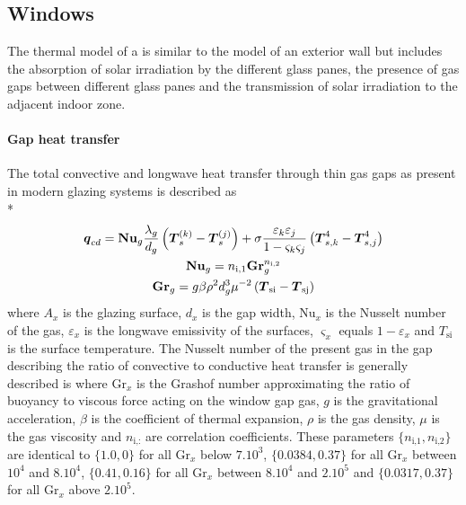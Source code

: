 \subsection{Windows}

The thermal model of a  is similar to the model of an exterior wall but includes the absorption of solar irradiation by the different glass panes, the presence of gas gaps between different glass panes and the transmission of solar irradiation to the adjacent indoor zone.

\paragraph{Gap heat transfer}
The total convective and longwave heat transfer through thin gas gaps as present in modern glazing systems is described as \\*
\begin{gather}
\boldsymbol{q}_{cd} = \mathbf{Nu}_{g} \frac{\lambda_{g}}{d_{g}} \left(\boldsymbol{T}_{s}^{(k)}-\boldsymbol{T}_{s}^{(j)}\right) + \sigma \frac{\varepsilon_{k} \varepsilon_{j}}{1-\varsigma_{k}\varsigma_{j}} \left(\boldsymbol{T}_{s,k}^{4}-\boldsymbol{T}_{s,j}^{4}\right) \\
\mathbf{Nu}_{g} = n_{\textrm{i,1}} \mathbf{Gr}_{g}^{n_{\textrm{i,2}}} \\
\mathbf{Gr}_{g} = g \beta \rho^{2} d_{g}^{3} \mu^{-2} \left(\boldsymbol{T}_{\textrm{si}}-\boldsymbol{T}_{\textrm{sj}}\right)
\end{gather}
where $A_{x}$ is the glazing surface, $d_{x}$ is the gap width, $\textrm{Nu}_{x}$ is the Nusselt number of the gas, $\varepsilon_{x}$ is the longwave emissivity of the surfaces, $\varsigma_{x}$ equals $1-\varepsilon_{x}$ and $T_{\textrm{si}}$ is the surface temperature. The Nusselt number of the present gas in the gap describing the ratio of convective to conductive heat transfer is generally described is where $\textrm{Gr}_{x}$ is the Grashof number approximating the ratio of buoyancy to viscous force acting on the window gap gas, $g$ is the gravitational acceleration, $\beta$ is the coefficient of thermal expansion, $\rho$ is the gas density, $\mu$ is the gas viscosity and $n_{\textrm{i,:}}$ are correlation coefficients. These parameters $\{n_{\textrm{i,1}},n_{\textrm{i,2}}\}$ are identical to $\{1.0,0\}$ for all $\textrm{Gr}_{x}$ below $7.10^{3}$, $\{0.0384,0.37\}$ for all $\textrm{Gr}_{x}$ between $10^{4}$ and $8.10^{4}$, $\{0.41,0.16\}$ for all $\textrm{Gr}_{x}$ between $8.10^{4}$ and $2.10^{5}$ and $\{0.0317,0.37\}$ for all $\textrm{Gr}_{x}$ above $2.10^{5}$. 

